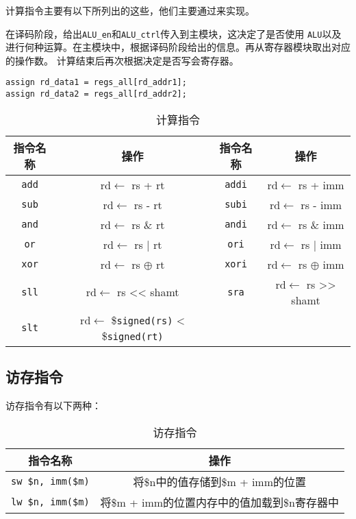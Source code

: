 \songti
\hspace*{9mm}计算指令主要有以下所列出的这些，他们主要通过来实现。

在译码阶段，给出\texttt{ALU\_en}和\texttt{ALU\_ctrl}传入到主模块，这决定了是否使用
\texttt{ALU}以及进行何种运算。在主模块中，根据译码阶段给出的信息。再从寄存器模块取出对应的操作数。
计算结束后再次根据决定是否写会寄存器。
\begin{lstlisting}[style = verilog-style, caption = {寄存器读取数据}]
assign rd_data1 = regs_all[rd_addr1];
assign rd_data2 = regs_all[rd_addr2];
\end{lstlisting}


\begin{table}
	\centering
	\caption{计算指令}
	\renewcommand\arraystretch{1.5}
	\kaishu
	\begin{tabular}{cccc}  
		\toprule[1pt]  
		\rowcolor[gray]{0.9}   指令名称 & 操作 &指令名称 &操作\\  
		\midrule  
		\texttt{add} & rd$\gets$ rs + rt &\texttt{addi} & rd$\gets$ rs + imm \\
		\texttt{sub} & rd$\gets$ rs - rt &\texttt{subi} & rd$\gets$ rs - imm \\
		\texttt{and} & rd$\gets$ rs \& rt &\texttt{andi} & rd$\gets$ rs \& imm \\
		\texttt{or} & rd$\gets$ rs | rt &\texttt{ori} & rd$\gets$ rs | imm \\
		\texttt{xor} & rd$\gets$ rs $\oplus$ rt &\texttt{xori} & rd$\gets$ rs $\oplus$ imm \\
		\texttt{sll} & rd$\gets$ rs << shamt &\texttt{sra} & rd$\gets$ rs >> shamt\\
		\texttt{slt} & rd$\gets$ \$\texttt{signed(rs)} < \$\texttt{signed(rt)} &&\\
		\bottomrule[1pt]  
		\end{tabular} 
\end{table}
\subsection{访存指令}
\songti
\hspace*{9mm}访存指令有以下两种：
\begin{table}[htbp]
	\centering
	\caption{访存指令}
	\renewcommand\arraystretch{1.5}
	\kaishu
	\begin{tabular}{cc}  
		\toprule[1pt]  
		\rowcolor[gray]{0.9}   指令名称 & 操作\\  
		\midrule  
		\texttt{sw \$n, imm(\$m)} & 将\$n中的值存储到\$m + imm的位置\\
		\texttt{lw \$n, imm(\$m)} & 将\$m + imm的位置内存中的值加载到\$n寄存器中\\
		\bottomrule[1pt]  
		\end{tabular} 
\end{table}

